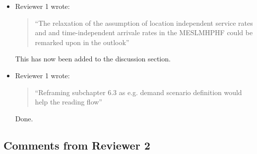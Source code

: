 \documentclass{article}
\begin{document}
\begin{itemize}
\item Reviewer 1 wrote:
\begin{quote}
``The relaxation of the assumption of location independent service rates and and time-independent arrivale rates in the MESLMHPHF could be remarked upon in the outlook''
\end{quote}
This has now been added to the discussion section.

\item Reviewer 1 wrote:
\begin{quote}
``Reframing subchapter 6.3 as e.g. demand scenario definition would help the reading flow''
\end{quote}
Done.

\end{itemize}

\subsection{Comments from Reviewer 2}
\end{document}
